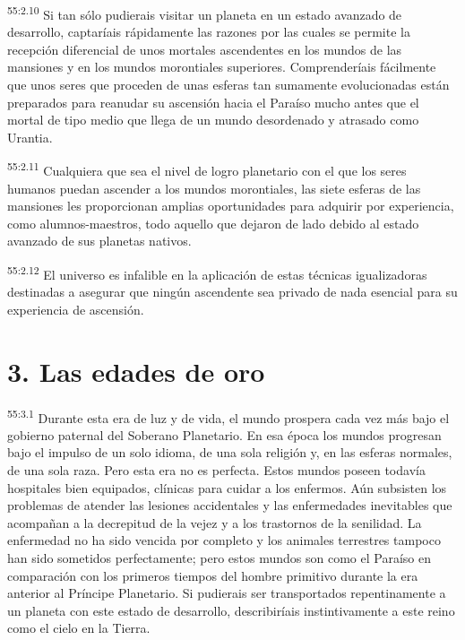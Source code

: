 \par
\textsuperscript{55:2.10} Si tan sólo pudierais visitar un planeta en un estado avanzado de desarrollo, captaríais rápidamente las razones por las cuales se permite la recepción diferencial de unos mortales ascendentes en los mundos de las mansiones y en los mundos morontiales superiores. Comprenderíais fácilmente que unos seres que proceden de unas esferas tan sumamente evolucionadas están preparados para reanudar su ascensión hacia el Paraíso mucho antes que el mortal de tipo medio que llega de un mundo desordenado y atrasado como Urantia.

\par
\textsuperscript{55:2.11} Cualquiera que sea el nivel de logro planetario con el que los seres humanos puedan ascender a los mundos morontiales, las siete esferas de las mansiones les proporcionan amplias oportunidades para adquirir por experiencia, como alumnos-maestros, todo aquello que dejaron de lado debido al estado avanzado de sus planetas nativos.

\par
\textsuperscript{55:2.12} El universo es infalible en la aplicación de estas técnicas igualizadoras destinadas a asegurar que ningún ascendente sea privado de nada esencial para su experiencia de ascensión.

\section*{3. Las edades de oro}
\par
\textsuperscript{55:3.1} Durante esta era de luz y de vida, el mundo prospera cada vez más bajo el gobierno paternal del Soberano Planetario. En esa época los mundos progresan bajo el impulso de un solo idioma, de una sola religión y, en las esferas normales, de una sola raza. Pero esta era no es perfecta. Estos mundos poseen todavía hospitales bien equipados, clínicas para cuidar a los enfermos. Aún subsisten los problemas de atender las lesiones accidentales y las enfermedades inevitables que acompañan a la decrepitud de la vejez y a los trastornos de la senilidad. La enfermedad no ha sido vencida por completo y los animales terrestres tampoco han sido sometidos perfectamente; pero estos mundos son como el Paraíso en comparación con los primeros tiempos del hombre primitivo durante la era anterior al Príncipe Planetario. Si pudierais ser transportados repentinamente a un planeta con este estado de desarrollo, describiríais instintivamente a este reino como el cielo en la Tierra.

